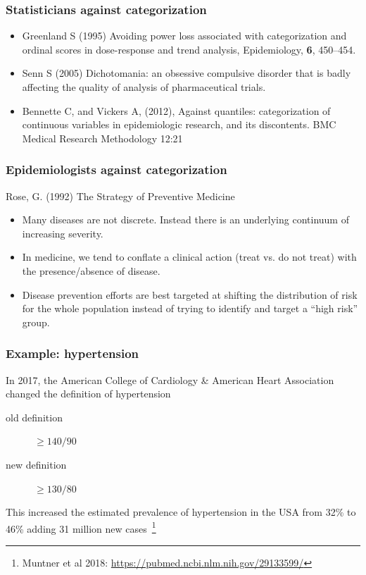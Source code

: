 \documentclass[aspectratio=169]{beamer}
\begin{document}
\begin{frame}
  \frametitle{Statisticians against categorization}
  \begin{itemize}
  \item Greenland S (1995) Avoiding power loss associated with
    categorization and ordinal scores in dose-response and trend
    analysis, Epidemiology, {\bf 6}, 450--454.
  \item Senn S (2005) Dichotomania: an obsessive compulsive disorder
    that is badly affecting the quality of analysis of pharmaceutical trials.
  \item Bennette C, and Vickers A, (2012), Against quantiles:
    categorization of continuous variables in epidemiologic research,
    and its discontents. BMC Medical Research Methodology 12:21
  \end{itemize}
\end{frame}

\begin{frame}
  \frametitle{Epidemiologists against categorization}

  Rose, G. (1992) The Strategy of Preventive Medicine
  \begin{itemize}
  \item Many diseases are not discrete. Instead there is an underlying
    continuum of increasing severity.
  \item In medicine, we tend to conflate a clinical action (treat
    vs. do not treat) with the presence/absence of disease.
  \item Disease prevention efforts are best targeted at shifting the
    distribution of risk for the whole population instead of trying to
    identify and target a ``high risk'' group.
  \end{itemize}

\end{frame}

\begin{frame}
  \frametitle{Example: hypertension}
  
  In 2017, the American College of Cardiology \& American Heart Association
  changed the definition of hypertension
  \begin{description}
  \item[old definition] $\geq 140/90$
  \item[new definition] $\geq 130/80$
  \end{description}

  This increased the estimated prevalence of hypertension in the USA from 32\% to 46\%
  adding 31 million new cases~\footnote{Muntner et al 2018: \url{https://pubmed.ncbi.nlm.nih.gov/29133599/}}
  
\end{frame}
\end{document}
